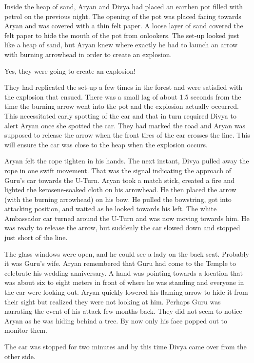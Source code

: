 Inside the heap of sand, Aryan and Divya had placed an earthen pot filled with
petrol on the previous night. The opening of the pot was placed facing
towards Aryan and was covered with a thin felt paper. A loose layer of sand
covered the felt paper to hide the mouth of the pot from onlookers. The set-up
looked just like a heap of sand, but Aryan knew where exactly he had to launch an
arrow with burning arrowhead in order to create an explosion.

Yes, they were going to create an explosion!

They had replicated the set-up a few times in the forest and were satisfied with
the explosion that ensued. There was a small lag of about 1.5 seconds from the
time the burning arrow went into the pot and the explosion actually occurred.
This necessitated early spotting of the car and that in turn required Divya to
alert Aryan once she spotted the car. They had marked the road and Aryan was
supposed to release the arrow when the front tires of the car crosses the line.
This will ensure the car was close to the heap when the explosion occurs.

Aryan felt the rope tighten in his hands. The next instant, Divya pulled away
the rope in one swift movement. That was the signal indicating the approach of
Guru's car towards the U-Turn. Aryan took a match stick, created a fire and
lighted the kerosene-soaked cloth on his arrowhead. He then placed the arrow
(with the burning arrowhead) on his bow. He pulled the bowstring, got into
attacking position, and waited as he looked towards his left. The white
Ambassador car turned around the U-Turn and was now moving towards him. He was
ready to release the arrow, but suddenly the car slowed down and stopped just
short of the line.

The glass windows were open, and he could see a lady on the back seat. Probably
it was Guru's wife. Aryan remembered that Guru had come to the Temple to
celebrate his wedding anniversary. A hand was pointing towards a location that
was about six to eight meters in front of where he was standing and everyone in
the car were looking out. Aryan quickly lowered his flaming arrow to hide it
from their sight but realized they were not looking at him. Perhaps Guru was
narrating the event of his attack few months back. They did not seem to notice
Aryan as he was hiding behind a tree. By now only his face popped out to monitor
them.

The car was stopped for two minutes and by this time Divya came over from the
other side.

